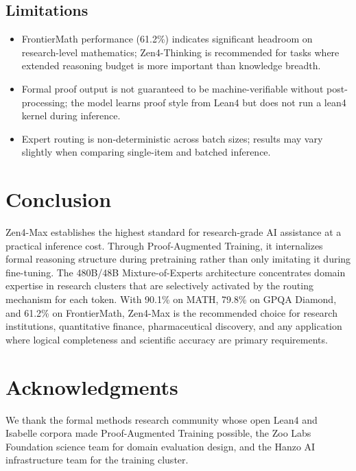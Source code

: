 \documentclass[11pt,a4paper]{article}
\begin{document}
\subsection{Limitations}

\begin{itemize}
    \item FrontierMath performance (61.2\%) indicates significant headroom on research-level
    mathematics; Zen4-Thinking is recommended for tasks where extended reasoning budget
    is more important than knowledge breadth.
    \item Formal proof output is not guaranteed to be machine-verifiable without post-processing;
    the model learns proof style from Lean4 but does not run a lean4 kernel during inference.
    \item Expert routing is non-deterministic across batch sizes; results may vary slightly
    when comparing single-item and batched inference.
\end{itemize}

\section{Conclusion}

Zen4-Max establishes the highest standard for research-grade AI assistance at a practical
inference cost. Through Proof-Augmented Training, it internalizes formal reasoning
structure during pretraining rather than only imitating it during fine-tuning. The 480B/48B
Mixture-of-Experts architecture concentrates domain expertise in research clusters that are
selectively activated by the routing mechanism for each token. With 90.1\% on MATH,
79.8\% on GPQA Diamond, and 61.2\% on FrontierMath, Zen4-Max is the recommended choice
for research institutions, quantitative finance, pharmaceutical discovery, and any
application where logical completeness and scientific accuracy are primary requirements.

\section*{Acknowledgments}

We thank the formal methods research community whose open Lean4 and Isabelle corpora
made Proof-Augmented Training possible, the Zoo Labs Foundation science team for
domain evaluation design, and the Hanzo AI infrastructure team for the training cluster.
\end{document}
